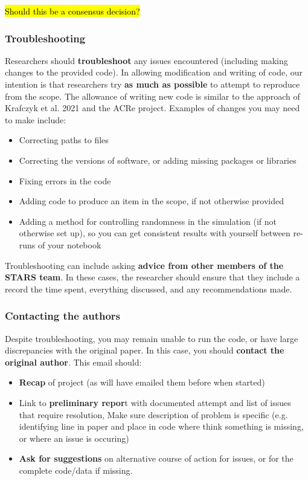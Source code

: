 \hl{Should this be a consensus decision?}

\vspace{0.5cm}
\subsubsection{Troubleshooting}

Researchers should \textbf{troubleshoot} any issues encountered (including making changes to the provided code). In allowing modification and writing of code, our intention is that researchers try \textbf{as much as possible} to attempt to reproduce from the scope. The allowance of writing new code is similar to the approach of Krafczyk et al. 2021\autocite{krafczyk_learning_2021} and the ACRe project\autocite{berkeley_initiative_for_transparency_in_the_social_sciences_guide_2022}. Examples of changes you may need to make include:
\begin{itemize}
    \item Correcting paths to files
    \item Correcting the versions of software, or adding missing packages or libraries
    \item Fixing errors in the code
    \item Adding code to produce an item in the scope, if not otherwise provided
    \item Adding a method for controlling randomness in the simulation (if not otherwise set up), so you can get consistent results with yourself between re-runs of your notebook
\end{itemize}

Troubleshooting can include asking \textbf{advice from other members of the STARS team}. In these cases, the researcher should ensure that they include a record the time spent, everything discussed, and any recommendations made.

\vspace{0.5cm}
\subsubsection{Contacting the authors}

Despite troubleshooting, you may remain unable to run the code, or have large discrepancies with the original paper. In this case, you should \textbf{contact the original author}. This email should:
\begin{itemize}
    \item \textbf{Recap} of project (as will have emailed them before when started)
    \item Link to \textbf{preliminary repor}t with documented attempt and list of issues that require resolution, Make sure description of problem is specific (e.g. identifying line in paper and place in code where think something is missing, or where an issue is occuring)
    \item \textbf{Ask for suggestions} on alternative course of action for issues, or for the complete code/data if missing.
\end{itemize}

